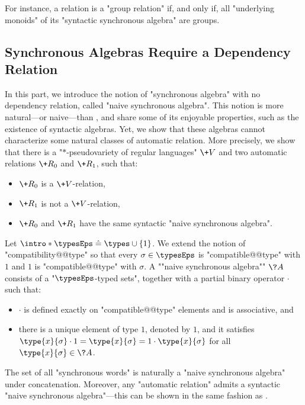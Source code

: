 For instance, a relation is a "group relation" if, and only if, all
"underlying monoids" of its "syntactic synchronous algebra" are
groups. 

\subsection{Synchronous Algebras Require a Dependency Relation}
\label{sec:counterexample}

In this part, we introduce the notion of "synchronous algebra" with no dependency relation, 
called "naive synchronous algebra". This notion is more natural---or naive---than
, and share some of its enjoyable properties, such as the existence of syntactic algebras. Yet, we show that these algebras cannot characterize some
natural classes of automatic relation. More precisely, we show that there
is a "$\ast$-pseudovariety of regular languages" $\+V$ and two automatic relations
$\+R_0$ and $\+R_1$, such that:
\begin{itemize}
	\item $\+R_0$ is a $\+V$-relation,
	\item $\+R_1$ is not a $\+V$-relation,
	\item $\+R_0$ and $\+R_1$ have the same syntactic "naive synchronous algebra".
\end{itemize}

\begin{definition}
	Let $\intro*\typesEps \defeq \types \cup \{1\}$. We extend the notion of "compatibility@@type" so 
	that every $\sigma \in \typesEps$ is "compatible@@type" with $1$ and
	$1$ is "compatible@@type" with $\sigma$.
	A \AP""naive synchronous algebra"" $\?A$ consists of a "$\typesEps$-typed sets",
	together with a partial binary operator $\cdot$ such that:
	\begin{itemize}
		\item $\cdot$ is defined exactly on "compatible@@type" elements and is associative, and
		\item there is a unique element of type $1$, denoted by $1$, and it satisfies
			$\type{x}{\sigma} \cdot 1 = \type{x}{\sigma} = 1 \cdot \type{x}{\sigma}$
			for all $\type{x}{\sigma} \in \?A$.
	\end{itemize}
\end{definition}

The set of all "synchronous words" is naturally a "naive synchronous algebra" under concatenation.
Moreover, any "automatic relation" admits a syntactic "naive synchronous algebra"---this can be shown in the same fashion as .

